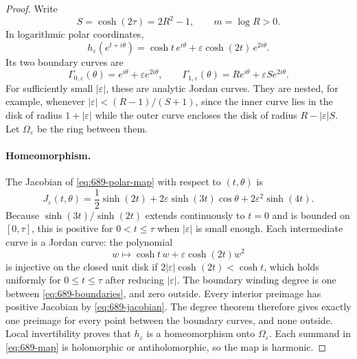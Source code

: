 \documentclass[11pt,a4paper]{article}
\theoremstyle{remark}
\begin{document}
\begin{proof}
Write
\[
 S=\cosh(2\tau)=2R^2-1,\qquad m=\log R>0.
\]
In logarithmic polar coordinates,
\begin{equation}
 h_\varepsilon(e^{t+i\theta})
 =\cosh t\,e^{i\theta}+\varepsilon\cosh(2t)\,e^{2i\theta}.
 \label{eq:689-polar-map}
\end{equation}
Its two boundary curves are
\begin{equation}
 \Gamma_{0,\varepsilon}(\theta)=e^{i\theta}+\varepsilon e^{2i\theta},
 \qquad
 \Gamma_{1,\varepsilon}(\theta)=R e^{i\theta}+\varepsilon S e^{2i\theta}.
 \label{eq:689-boundaries}
\end{equation}
For sufficiently small $|\varepsilon|$, these are analytic Jordan curves. They are nested, for example, whenever $|\varepsilon|<(R-1)/(S+1)$, since the inner curve lies in the disk of radius $1+|\varepsilon|$ while the outer curve encloses the disk of radius $R-|\varepsilon|S$. Let $\Omega_\varepsilon$ be the ring between them.

\paragraph{Homeomorphism.}
The Jacobian of \eqref{eq:689-polar-map} with respect to $(t,\theta)$ is
\begin{equation}
 J_\varepsilon(t,\theta)
 =\frac12\sinh(2t)+2\varepsilon\sinh(3t)\cos\theta
       +2\varepsilon^2\sinh(4t).
 \label{eq:689-jacobian}
\end{equation}
Because $\sinh(3t)/\sinh(2t)$ extends continuously to $t=0$ and is bounded on $[0,\tau]$, this is positive for $0<t\le\tau$ when $|\varepsilon|$ is small enough. Each intermediate curve is a Jordan curve: the polynomial
\[
 w\longmapsto\cosh t\,w+\varepsilon\cosh(2t)w^2
\]
is injective on the closed unit disk if $2|\varepsilon|\cosh(2t)<\cosh t$, which holds uniformly for $0\le t\le\tau$ after reducing $|\varepsilon|$. The boundary winding degree is one between \eqref{eq:689-boundaries}, and zero outside. Every interior preimage has positive Jacobian by \eqref{eq:689-jacobian}. The degree theorem therefore gives exactly one preimage for every point between the boundary curves, and none outside. Local invertibility proves that $h_\varepsilon$ is a homeomorphism onto $\Omega_\varepsilon$. Each summand in \eqref{eq:689-map} is holomorphic or antiholomorphic, so the map is harmonic.


\end{proof}
\end{document}
